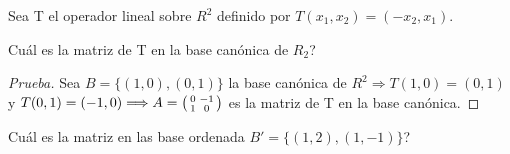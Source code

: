 \documentclass[12pt]{article}
\newenvironment{problem}[2][Problem]{\begin{trivlist}
\item[\hskip \labelsep {\bfseries #1}\hskip \labelsep {\bfseries #2.}]}{\end{trivlist}}
\newenvironment{xmat}
  {\left(\begin{smallmatrix}}
  {\end{smallmatrix}\right)}
\begin{document}
\begin{problem}{4}
Sea T el operador lineal sobre $R^{2}$ definido por  $T(x_{1},x_{2})=(-x_{2},x_{1})$.
\end{problem}

\begin{problem}{4.1}
Cuál es la matriz de T en la base canónica de $R_{2}$?
\end{problem}

\begin{proof} [Prueba]
Sea $B=\{(1,0), (0,1)\}$ la base canónica de $R^{2} \Longrightarrow T(1,0)=(0,1)$ y $T(0,1)=(-1,0) \Longrightarrow A=\begin{xmat}0 & -1\\1 & 0\end{xmat}$ es la matriz de T en la base canónica.
\end{proof} 

\begin{problem}{4.2}
Cuál es la matriz en las base ordenada $B'=\{(1,2), (1,-1)\}$?
\end{problem}
\end{document}
